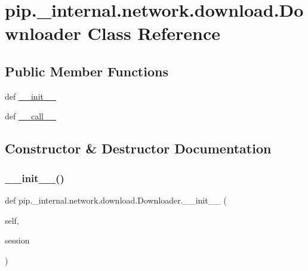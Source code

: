 \hypertarget{classpip_1_1__internal_1_1network_1_1download_1_1Downloader}{}\section{pip.\+\_\+internal.\+network.\+download.\+Downloader Class Reference}
\label{classpip_1_1__internal_1_1network_1_1download_1_1Downloader}
\subsection*{Public Member Functions}
\begin{DoxyCompactItemize}
\item 
def \hyperlink{classpip_1_1__internal_1_1network_1_1download_1_1Downloader_a6c4f906889060d76022c1b9c0a9b7817}{\+\_\+\+\_\+init\+\_\+\+\_\+}
\item 
def \hyperlink{classpip_1_1__internal_1_1network_1_1download_1_1Downloader_a18b71b3aa6b3edb6bcd1299536d010ef}{\+\_\+\+\_\+call\+\_\+\+\_\+}
\end{DoxyCompactItemize}


\subsection{Constructor \& Destructor Documentation}
\mbox{\label{classpip_1_1__internal_1_1network_1_1download_1_1Downloader_a6c4f906889060d76022c1b9c0a9b7817}} 
\subsubsection{\texorpdfstring{\+\_\+\+\_\+init\+\_\+\+\_\+()}{\_\_init\_\_()}}
{\footnotesize\ttfamily def pip.\+\_\+internal.\+network.\+download.\+Downloader.\+\_\+\+\_\+init\+\_\+\+\_\+ (\begin{DoxyParamCaption}\item[{}]{self,  }\item[{}]{session }\end{DoxyParamCaption})}



